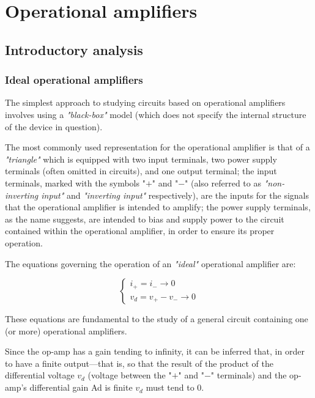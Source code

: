 \documentclass[../main.tex]{subfiles}
\begin{document}
\clearpage
\thispagestyle{empty}
\vspace*{7cm}
\section{Operational amplifiers}
\vspace*{1.5cm}

\subsection{Introductory analysis}

\subsubsection{Ideal operational amplifiers}


The simplest approach to studying circuits based on operational amplifiers involves using a \textit{"black-box"} model (which does not specify the internal structure of the device in question). 

The most commonly used representation for the operational amplifier is that of a \textit{"triangle"} which is equipped with two input terminals, two power supply terminals (often omitted in circuits), and one output terminal; the input terminals, marked with the symbols "$+$" and "$-$" (also referred to as \textit{"non-inverting input"} and \textit{"inverting input"} respectively), are the inputs for the signals that the operational amplifier is intended to amplify; the power supply terminals, as the name suggests, are intended to bias and supply power to the circuit contained within the operational amplifier, in order to ensure its proper operation. 

The equations governing the operation of an \textit{"ideal"} operational amplifier are:

\begin{equation}
\begin{cases}
	i_+ = i_- \rightarrow 0 \\
	v_d = v_+ - v_{-} \rightarrow 0
\end{cases}
\end{equation}


These equations are fundamental to the study of a general circuit containing one (or more) operational amplifiers. 

Since the op-amp has a gain tending to infinity, it can be inferred that, in order to have a finite output—that is, so that the result of the product of the differential voltage $v_d$ (voltage between the "$+$" and "$-$" terminals) and the op-amp’s differential gain Ad is finite $v_d$ must tend to 0. 
\end{document}

